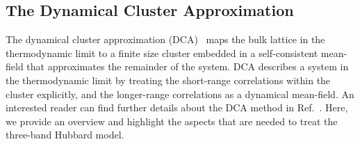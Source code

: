 \documentclass[reprint,nofootinbib,nobibnotes,amsmath,amssymb,aps,prb,floatfix]{revtex4-1}
\begin{document}
\vskip 0.5cm 
\noindent
\subsection{ The Dynamical Cluster Approximation}\label{sec:MethodsDCA}
The dynamical cluster approximation (DCA)~\cite{Maier1, Maier2, Maier3} maps the bulk lattice in the thermodynamic limit to a finite size cluster embedded in a self-consistent mean-field that approximates the remainder of the system. DCA describes a system in the thermodynamic limit by treating the short-range correlations within the cluster explicitly, and the longer-range correlations as a dynamical mean-field. An interested reader can find further details about the DCA method in Ref.~\cite{Maier1}. Here, we provide an overview and highlight the aspects that are needed to treat the three-band Hubbard model.
\end{document}
